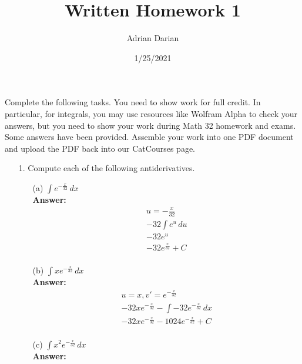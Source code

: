 \documentclass[a4paper]{article}
\title{Written Homework 1}
\author{Adrian Darian}
\date{1/25/2021}
\begin{document}
  
\maketitle
  
Complete the following tasks. You need to show work for full credit. In particular, for integrals, you may use resources like Wolfram Alpha to check your answers, but you need to show your work during Math 32 homework and exams. Some answers have been provided. Assemble your work into one PDF document and upload the PDF back into our CatCourses page.

\begin{itemize}
	\item[1.] Compute each of the following antiderivatives.
	      \begin{itemize}
	      	\item[(a)] $\int e^{-\frac{x}{32}} \,dx$ \\
	      	      \textbf{Answer:} 
	      	      \begin{equation}
	      	      	\begin{split}
	      	      		u = -\frac{x}{32} \\
	      	      		-32 \int e^u \,du \\
	      	      		-32 e^{u} \\
	      	      		-32 e^{\frac{x}{32}} + C \\
	      	      	\end{split}
	      	      \end{equation}
	      	\item[(b)] $\int xe^{-\frac{x}{32}} \,dx$ \\
	      	      \textbf{Answer:} 
	      	      \begin{equation}
	      	      	\begin{split}
	      	      		u = x, v' = e^{-\frac{x}{32}} \\
	      	      		-32xe^{-\frac{x}{32}} - \int -32e^{-\frac{x}{32}} \,dx \\
	      	      		-32xe^{-\frac{x}{32}} - 1024e^{-\frac{x}{32}} + C \\
	      	      	\end{split}
	      	      \end{equation}
	      	\item[(c)] $\int x^{2}e^{-\frac{x}{32}} \,dx$ \\
	      	      \textbf{Answer:} 
	      	      \begin{equation}
	      	      	\begin{split}

\end{split}
\end{equation}
\end{itemize}
\end{itemize}
\end{document}
